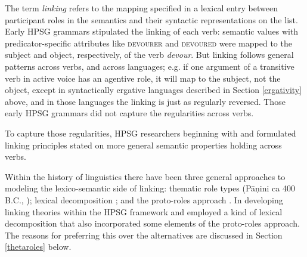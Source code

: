 \documentclass[output=paper
                ,modfonts
                ,nonflat
	        ,collection
	        ,collectionchapter
	        ,collectiontoclongg
 	        ,biblatex
                ,babelshorthands
                ,newtxmath
                ,draftmode
                ,colorlinks, citecolor=brown
]{./langsci/langscibook}
\begin{document}
The term \textit{linking} refers to the mapping specified in a lexical entry between participant roles  in the semantics and their syntactic representations on the \argst list.  
Early HPSG grammars stipulated the linking of each verb:  semantic \content values with predicator-specific attributes like \textsc{devourer} and \textsc{devoured} were mapped to the subject and object, respectively, of the verb \textit{devour}.  But linking follows general patterns across verbs, and across languages; e.g. if one argument of a transitive verb in active voice has an agentive role, it will map to the subject, not the object, 
except in syntactically ergative languages described in Section \ref{ergativity} above, and in those languages the linking is just as regularly reversed.
Those early HPSG grammars did not capture the regularities across verbs.  

To capture those regularities, HPSG researchers beginning with \citet{Wechsler1995b} and \citet{Davis1996} formulated linking principles stated on more general semantic properties holding across verbs.  

Within the history of linguistics there have been three general approaches to modeling the lexico-semantic side of linking: thematic role types 
(P\={a}\d{n}ini ca 400 B.C., \citealt{Fillmore1968}); lexical decomposition  \citep{FoleyandvanValin1984,RappaportandLevin1998}; and the proto-roles approach  \citep{Dowty1991}.   In developing linking theories within the HPSG framework \citet{Wechsler1995b} and \citet{Davis1996} employed a kind of lexical decomposition that also incorporated some elements of the proto-roles approach.  The reasons for preferring this over the alternatives are discussed in Section \ref{thetaroles} below.  
\end{document}
